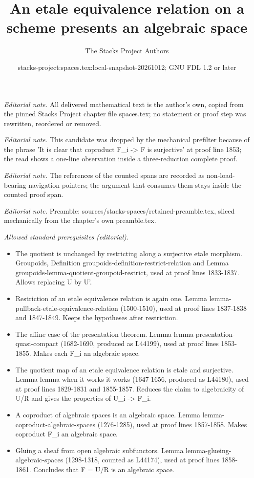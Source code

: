 \documentclass[10pt,a4paper]{amsart}
\title{An etale equivalence relation on a scheme presents an algebraic space}
\author{The Stacks Project Authors}
\date{stacks-project:spaces.tex:local-snapshot-20261012; GNU FDL 1.2 or later}
\theoremstyle{plain}
\theoremstyle{definition}
\theoremstyle{remark}
\numberwithin{equation}{subsection}
\begin{document}
\maketitle
\setcounter{subsection}{1}
\noindent\textit{Editorial note.} All delivered mathematical text is the author's own, copied from the pinned Stacks Project chapter file spaces.tex; no statement or proof step was rewritten, reordered or removed.\par\medskip
\noindent\textit{Editorial note.} This candidate was dropped by the mechanical prefilter because of the phrase 'It is clear that coproduct F\_i -> F is surjective' at proof line 1853; the read shows a one-line observation inside a three-reduction complete proof.\par\medskip
\noindent\textit{Editorial note.} The references of the counted spans are recorded as non-load-bearing navigation pointers; the argument that consumes them stays inside the counted proof span.\par\medskip
\noindent\textit{Editorial note.} Preamble: sources/stacks-spaces/retained-preamble.tex, sliced mechanically from the chapter's own preamble.tex.\par\medskip
\noindent\textit{Allowed standard prerequisites (editorial).}\begin{itemize}
\item The quotient is unchanged by restricting along a surjective etale morphism. Groupoids, Definition groupoids-definition-restrict-relation and Lemma groupoids-lemma-quotient-groupoid-restrict, used at proof lines 1833-1837. Allows replacing U by U'.
\item Restriction of an etale equivalence relation is again one. Lemma lemma-pullback-etale-equivalence-relation (1500-1510), used at proof lines 1837-1838 and 1847-1849. Keeps the hypotheses after restriction.
\item The affine case of the presentation theorem. Lemma lemma-presentation-quasi-compact (1682-1690, produced as L44199), used at proof lines 1853-1855. Makes each F\_i an algebraic space.
\item The quotient map of an etale equivalence relation is etale and surjective. Lemma lemma-when-it-works-it-works (1647-1656, produced as L44180), used at proof lines 1829-1831 and 1855-1857. Reduces the claim to algebraicity of U/R and gives the properties of U\_i -> F\_i.
\item A coproduct of algebraic spaces is an algebraic space. Lemma lemma-coproduct-algebraic-spaces (1276-1285), used at proof lines 1857-1858. Makes coproduct F\_i an algebraic space.
\item Gluing a sheaf from open algebraic subfunctors. Lemma lemma-glueing-algebraic-spaces (1298-1318, counted as L44174), used at proof lines 1858-1861. Concludes that F = U/R is an algebraic space.
\end{itemize}\medskip
\end{document}
